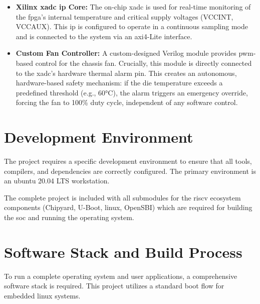 \begin{itemize}
    \item \textbf{Xilinx \acrshort{xadc} \acrshort{ip} Core:} The on-chip \acrfull{xadc} is used for real-time monitoring of the \acrshort{fpga}'s internal temperature and critical supply voltages (VCCINT, VCCAUX). This \acrshort{ip} is configured to operate in a continuous sampling mode and is connected to the system via an \acrshort{axi4}-Lite interface.
    
    \item \textbf{Custom Fan Controller:} A custom-designed Verilog module provides \acrshort{pwm}-based control for the chassis fan. Crucially, this module is directly connected to the \acrshort{xadc}'s hardware thermal alarm pin. This creates an autonomous, hardware-based safety mechanism: if the die temperature exceeds a predefined threshold (e.g., 60°C), the alarm triggers an emergency override, forcing the fan to 100\% duty cycle, independent of any software control.
\end{itemize}

\section{Development Environment}
The project requires a specific development environment to ensure that all tools, compilers, and dependencies are correctly configured. The primary environment is an \acrshort{ubuntu} 20.04 LTS workstation. 

The complete project is included with all submodules for the \acrshort{riscv} ecosystem components (Chipyard, U-Boot, \acrshort{linux}, OpenSBI) which are required for building the \acrshort{soc} and running the operating system.

\section{Software Stack and Build Process}
To run a complete operating system and user applications, a comprehensive software stack is required. This project utilizes a standard boot flow for embedded \acrshort{linux} systems.

